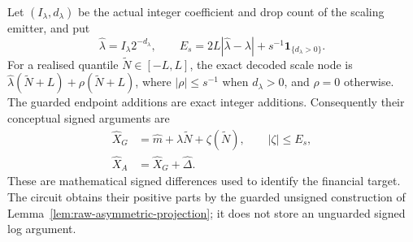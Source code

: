 Let $(I_\lambda,d_\lambda)$ be the actual integer coefficient and
drop count of the scaling emitter, and put
\begin{equation}
 \widehat\lambda=I_\lambda2^{-d_\lambda},\qquad
 E_s=2L|\widehat\lambda-\lambda|
       +s^{-1}\mathbf1_{\{d_\lambda>0\}}.
\end{equation}
For a realised quantile $\widetilde N\in[-L,L]$, the exact decoded
scale node is
$\widehat\lambda(\widetilde N+L)+\rho(\widetilde N+L)$,
where $|\rho|\leq s^{-1}$ when $d_\lambda>0$, and $\rho=0$
otherwise. The guarded endpoint additions are exact integer additions.
Consequently their conceptual signed arguments are
\begin{align}
 \widehat X_G&=\widehat m+\lambda\widetilde N+
                    \zeta(\widetilde N),\qquad |\zeta|\leq E_s,\label{eq:raw-asymmetric-arguments}\\
 \widehat X_A&=\widehat X_G+\widehat\Delta.\nonumber
\end{align}
These are mathematical signed differences used to identify the financial
target. The circuit obtains their positive parts by the guarded unsigned
construction of Lemma~\ref{lem:raw-asymmetric-projection}; it does not
store an unguarded signed log argument.

